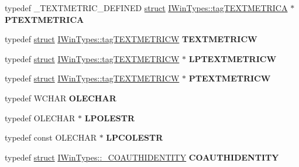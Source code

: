 \begin{DoxyCompactItemize}
\mbox{\label{interface_i_win_types_a656a887378bfecf7493c2dafe63eb112}} 
typedef \+\_\+\+T\+E\+X\+T\+M\+E\+T\+R\+I\+C\+\_\+\+D\+E\+F\+I\+N\+ED \hyperlink{interfacestruct}{struct} \hyperlink{struct_i_win_types_1_1tag_t_e_x_t_m_e_t_r_i_c_a}{I\+Win\+Types\+::tag\+T\+E\+X\+T\+M\+E\+T\+R\+I\+CA} $\ast$ {\bfseries P\+T\+E\+X\+T\+M\+E\+T\+R\+I\+CA}
\item 
\mbox{\label{interface_i_win_types_ae8d769f8011c26262f6e00260ad96ecc}} 
typedef \hyperlink{interfacestruct}{struct} \hyperlink{struct_i_win_types_1_1tag_t_e_x_t_m_e_t_r_i_c_w}{I\+Win\+Types\+::tag\+T\+E\+X\+T\+M\+E\+T\+R\+I\+CW} {\bfseries T\+E\+X\+T\+M\+E\+T\+R\+I\+CW}
\item 
\mbox{\label{interface_i_win_types_ab25d2b43f642f3764c7b4242556014a3}} 
typedef \hyperlink{interfacestruct}{struct} \hyperlink{struct_i_win_types_1_1tag_t_e_x_t_m_e_t_r_i_c_w}{I\+Win\+Types\+::tag\+T\+E\+X\+T\+M\+E\+T\+R\+I\+CW} $\ast$ {\bfseries L\+P\+T\+E\+X\+T\+M\+E\+T\+R\+I\+CW}
\item 
\mbox{\label{interface_i_win_types_a8d7eab7c3d5d7c8e47bdea3751a32797}} 
typedef \hyperlink{interfacestruct}{struct} \hyperlink{struct_i_win_types_1_1tag_t_e_x_t_m_e_t_r_i_c_w}{I\+Win\+Types\+::tag\+T\+E\+X\+T\+M\+E\+T\+R\+I\+CW} $\ast$ {\bfseries P\+T\+E\+X\+T\+M\+E\+T\+R\+I\+CW}
\item 
\mbox{\label{interface_i_win_types_ae98aa8ae43afbb0e8b5d8b9a44d08d73}} 
typedef W\+C\+H\+AR {\bfseries O\+L\+E\+C\+H\+AR}
\item 
\mbox{\label{interface_i_win_types_ac5b85597a0a0fde09829da6f2dceb1ec}} 
typedef O\+L\+E\+C\+H\+AR $\ast$ {\bfseries L\+P\+O\+L\+E\+S\+TR}
\item 
\mbox{\label{interface_i_win_types_a9f7cdf57d4ab72cc5d9a623dd25a3f58}} 
typedef const O\+L\+E\+C\+H\+AR $\ast$ {\bfseries L\+P\+C\+O\+L\+E\+S\+TR}
\item 
\mbox{\label{interface_i_win_types_a95510ae8775b46b1b8d1344c6a7fdf39}} 
typedef \hyperlink{interfacestruct}{struct} \hyperlink{struct_i_win_types_1_1___c_o_a_u_t_h_i_d_e_n_t_i_t_y}{I\+Win\+Types\+::\+\_\+\+C\+O\+A\+U\+T\+H\+I\+D\+E\+N\+T\+I\+TY} {\bfseries C\+O\+A\+U\+T\+H\+I\+D\+E\+N\+T\+I\+TY}

\end{DoxyCompactItemize}
